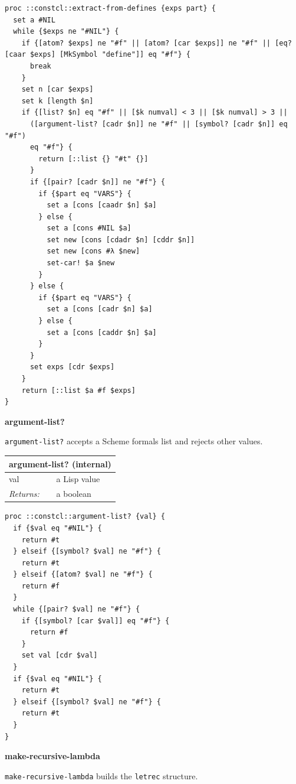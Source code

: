 \documentclass[twoside,9pt]{report}
\begin{document}
\noindent\makebox[\linewidth]{\rule{\linewidth}{0.4pt}}
\begin{lstlisting}
proc ::constcl::extract-from-defines {exps part} {
  set a #NIL
  while {$exps ne "#NIL"} {
    if {[atom? $exps] ne "#f" || [atom? [car $exps]] ne "#f" || [eq? [caar $exps] [MkSymbol "define"]] eq "#f"} {
      break
    }
    set n [car $exps]
    set k [length $n]
    if {[list? $n] eq "#f" || [$k numval] < 3 || [$k numval] > 3 ||
      ([argument-list? [cadr $n]] ne "#f" || [symbol? [cadr $n]] eq "#f")
      eq "#f"} {
        return [::list {} "#t" {}]
      }
      if {[pair? [cadr $n]] ne "#f"} {
        if {$part eq "VARS"} {
          set a [cons [caadr $n] $a]
        } else {
          set a [cons #NIL $a]
          set new [cons [cdadr $n] [cddr $n]]
          set new [cons #λ $new]
          set-car! $a $new
        }
      } else {
        if {$part eq "VARS"} {
          set a [cons [cadr $n] $a]
        } else {
          set a [cons [caddr $n] $a]
        }
      }
      set exps [cdr $exps]
    }
    return [::list $a #f $exps]
}
\end{lstlisting}
\noindent\makebox[\linewidth]{\rule{\linewidth}{0.4pt}}

\textbf{argument-list?}


\texttt{argument-list?} accepts a Scheme formals list and rejects other values.

\begin{tabular}{ |l l| }
\hline
\multicolumn{2}{|l|}{argument-list? (internal)} \\
\hline
val & a Lisp value \\
\textit{Returns:} & a boolean \\
\hline
\end{tabular}

\noindent\makebox[\linewidth]{\rule{\linewidth}{0.4pt}}
\begin{lstlisting}
proc ::constcl::argument-list? {val} {
  if {$val eq "#NIL"} {
    return #t
  } elseif {[symbol? $val] ne "#f"} {
    return #t
  } elseif {[atom? $val] ne "#f"} {
    return #f
  }
  while {[pair? $val] ne "#f"} {
    if {[symbol? [car $val]] eq "#f"} {
      return #f
    }
    set val [cdr $val]
  }
  if {$val eq "#NIL"} {
    return #t
  } elseif {[symbol? $val] ne "#f"} {
    return #t
  }
}
\end{lstlisting}
\noindent\makebox[\linewidth]{\rule{\linewidth}{0.4pt}}

\textbf{make-recursive-lambda}


\texttt{make-recursive-lambda} builds the \texttt{letrec} structure.
\end{document}
